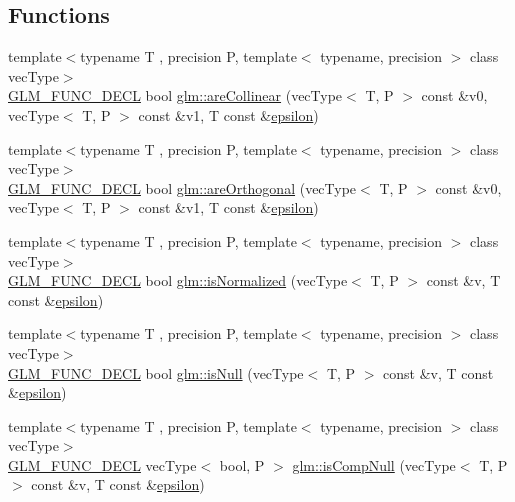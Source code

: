 \subsection*{Functions}
\begin{DoxyCompactItemize}
\item 
{\footnotesize template$<$typename T , precision P, template$<$ typename, precision $>$ class vec\+Type$>$ }\\\hyperlink{setup_8hpp_ab2d052de21a70539923e9bcbf6e83a51}{G\+L\+M\+\_\+\+F\+U\+N\+C\+\_\+\+D\+E\+CL} bool \hyperlink{group__gtx__vector__query_ga465b844190d1740051e45d780832ea4c}{glm\+::are\+Collinear} (vec\+Type$<$ T, P $>$ const \&v0, vec\+Type$<$ T, P $>$ const \&v1, T const \&\hyperlink{group__gtc__constants_gacb41049b8d22c8aa90e362b96c524feb}{epsilon})
\item 
{\footnotesize template$<$typename T , precision P, template$<$ typename, precision $>$ class vec\+Type$>$ }\\\hyperlink{setup_8hpp_ab2d052de21a70539923e9bcbf6e83a51}{G\+L\+M\+\_\+\+F\+U\+N\+C\+\_\+\+D\+E\+CL} bool \hyperlink{group__gtx__vector__query_gaee10acefed397c11e01f2862e837754c}{glm\+::are\+Orthogonal} (vec\+Type$<$ T, P $>$ const \&v0, vec\+Type$<$ T, P $>$ const \&v1, T const \&\hyperlink{group__gtc__constants_gacb41049b8d22c8aa90e362b96c524feb}{epsilon})
\item 
{\footnotesize template$<$typename T , precision P, template$<$ typename, precision $>$ class vec\+Type$>$ }\\\hyperlink{setup_8hpp_ab2d052de21a70539923e9bcbf6e83a51}{G\+L\+M\+\_\+\+F\+U\+N\+C\+\_\+\+D\+E\+CL} bool \hyperlink{group__gtx__vector__query_ga6fa5fa2af67d14c205d24c49aad03270}{glm\+::is\+Normalized} (vec\+Type$<$ T, P $>$ const \&v, T const \&\hyperlink{group__gtc__constants_gacb41049b8d22c8aa90e362b96c524feb}{epsilon})
\item 
{\footnotesize template$<$typename T , precision P, template$<$ typename, precision $>$ class vec\+Type$>$ }\\\hyperlink{setup_8hpp_ab2d052de21a70539923e9bcbf6e83a51}{G\+L\+M\+\_\+\+F\+U\+N\+C\+\_\+\+D\+E\+CL} bool \hyperlink{group__gtx__vector__query_ga81a64edc1a2b470b82896592e89c523b}{glm\+::is\+Null} (vec\+Type$<$ T, P $>$ const \&v, T const \&\hyperlink{group__gtc__constants_gacb41049b8d22c8aa90e362b96c524feb}{epsilon})
\item 
{\footnotesize template$<$typename T , precision P, template$<$ typename, precision $>$ class vec\+Type$>$ }\\\hyperlink{setup_8hpp_ab2d052de21a70539923e9bcbf6e83a51}{G\+L\+M\+\_\+\+F\+U\+N\+C\+\_\+\+D\+E\+CL} vec\+Type$<$ bool, P $>$ \hyperlink{group__gtx__vector__query_ga93ecd4137480483ce1af0de8bbbf6546}{glm\+::is\+Comp\+Null} (vec\+Type$<$ T, P $>$ const \&v, T const \&\hyperlink{group__gtc__constants_gacb41049b8d22c8aa90e362b96c524feb}{epsilon})

\end{DoxyCompactItemize}
